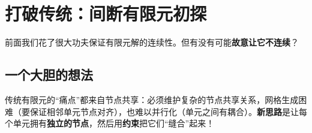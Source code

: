 \section{打破传统：间断有限元初探}

前面我们花了很大功夫保证有限元解的连续性。但有没有可能\textbf{故意让它不连续}？

\subsection{一个大胆的想法}

传统有限元的“痛点”都来自节点共享：必须维护复杂的节点共享关系，网格生成困难（要保证相邻单元节点对齐），也难以并行化（单元之间有耦合）。\textbf{新思路}是让每个单元拥有\textbf{独立的节点}，然后用\textbf{约束}把它们“缝合”起来！

